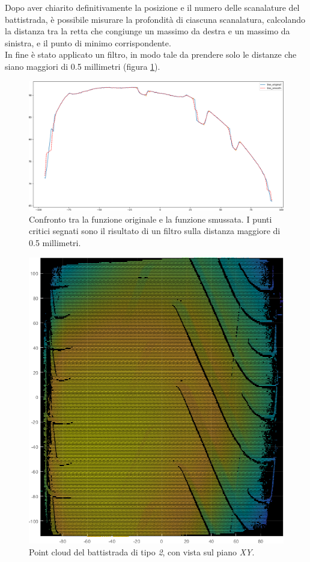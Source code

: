 \noindent Dopo aver chiarito definitivamente la posizione e il numero delle scanalature del battistrada, è possibile misurare la profondità di ciascuna scanalatura, calcolando la distanza tra la retta che congiunge un massimo da destra e un massimo da sinistra, e il punto di minimo corrispondente.\\
\newline
In fine è stato applicato un filtro, in modo tale da prendere solo le distanze che siano maggiori di 0.5 millimetri (figura \ref{fig:batt_2_analisi_10}).\\

\begin{figure}[H]
	\centering
	\includegraphics[width=0.9\columnwidth]{./pictures/batt_2_analisi_10.png}
	\caption{Confronto tra la funzione originale e la funzione smussata. I punti critici segnati sono il risultato di un filtro sulla distanza maggiore di 0.5 millimetri.}\label{fig:batt_2_analisi_10}
\end{figure}

\begin{figure}[H]
	\centering
	\includegraphics[width=0.5\columnwidth]{./pictures/battistrada.png}
	\caption{Point cloud del battistrada di tipo \textit{2}, con vista sul piano \textit{XY}.}\label{fig:battistrada}
\end{figure}

